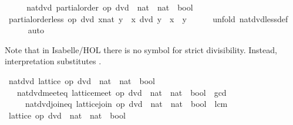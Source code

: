 \begin{isabellebody}
\ \ \isamarkupfalse%
\ \isamarkupfalse%
\ nat{\isacharunderscore}dvd{\isacharcolon}\ partial{\isacharunderscore}order\ {\isachardoublequoteopen}op\ dvd\ {\isacharcolon}{\isacharcolon}\ nat\ {\isasymRightarrow}\ nat\ {\isasymRightarrow}\ bool{\isachardoublequoteclose}\ \isacommand{{\isachardot}}\isamarkupfalse%
\isanewline
\ \ \isamarkupfalse%
\ {\isachardoublequoteopen}partial{\isacharunderscore}order{\isachardot}less\ op\ dvd\ {\isacharparenleft}x{\isacharcolon}{\isacharcolon}nat{\isacharparenright}\ y\ {\isacharequal}\ {\isacharparenleft}x\ dvd\ y\ {\isasymand}\ x\ {\isasymnoteq}\ y{\isacharparenright}{\isachardoublequoteclose}\isanewline
\ \ \ \ \isamarkupfalse%
\ {\isacharparenleft}unfold\ nat{\isacharunderscore}dvd{\isachardot}less{\isacharunderscore}def{\isacharparenright}\isanewline
\ \ \ \ \isamarkupfalse%
\ auto\isanewline
\ \ \ \ \isamarkupfalse%
\isanewline
{}\isamarkupfalse%
%
\endisatagproof
{\isafoldproof}%
%
\isadelimproof
%
\endisadelimproof
%
\begin{isamarkuptext}%
Note that in Isabelle/HOL there is no symbol for strict
  divisibility.  Instead, interpretation substitutes .%
\end{isamarkuptext}%
\isamarkuptrue%
\isamarkupfalse%
\ nat{\isacharunderscore}dvd{\isacharcolon}\ lattice\ {\isachardoublequoteopen}op\ dvd\ {\isacharcolon}{\isacharcolon}\ nat\ {\isasymRightarrow}\ nat\ {\isasymRightarrow}\ bool{\isachardoublequoteclose}\isanewline
\ \ \ nat{\isacharunderscore}dvd{\isacharunderscore}meet{\isacharunderscore}eq{\isacharcolon}\ {\isachardoublequoteopen}lattice{\isachardot}meet\ {\isacharparenleft}op\ dvd\ {\isacharcolon}{\isacharcolon}\ nat\ {\isasymRightarrow}\ nat\ {\isasymRightarrow}\ bool{\isacharparenright}\ {\isacharequal}\ gcd{\isachardoublequoteclose}\isanewline
\ \ \ \ \ nat{\isacharunderscore}dvd{\isacharunderscore}join{\isacharunderscore}eq{\isacharcolon}\ {\isachardoublequoteopen}lattice{\isachardot}join\ {\isacharparenleft}op\ dvd\ {\isacharcolon}{\isacharcolon}\ nat\ {\isasymRightarrow}\ nat\ {\isasymRightarrow}\ bool{\isacharparenright}\ {\isacharequal}\ lcm{\isachardoublequoteclose}\isanewline
%
\isadelimproof
%
\endisadelimproof
%
\isatagproof
{}\isamarkupfalse%
\ {\isacharminus}\isanewline
\ \ \isamarkupfalse%
\ {\isachardoublequoteopen}lattice\ {\isacharparenleft}op\ dvd\ {\isacharcolon}{\isacharcolon}\ nat\ {\isasymRightarrow}\ nat\ {\isasymRightarrow}\ bool{\isacharparenright}{\isachardoublequoteclose}\isanewline

\end{isabellebody}
